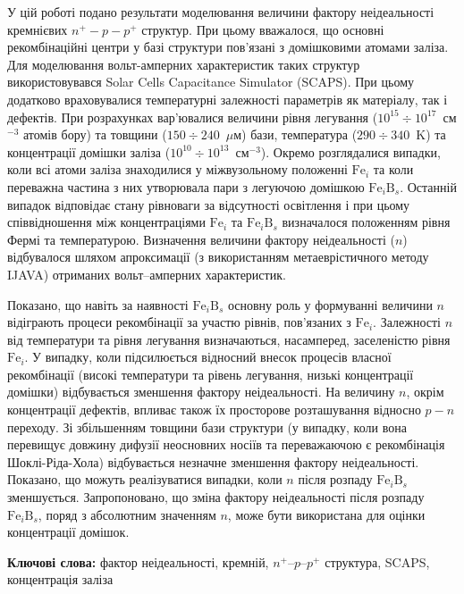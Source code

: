 \documentclass[12pt]{article}
\begin{document}
У цій роботі подано результати моделювання величини фактору не\-ідеально\-сті кремнієвих $n^+-p-p^+$ структур.
При цьому вважалося, що основні реком\-бі\-на\-цій\-ні центри у базі структури пов'язані з домішковими атомами заліза.
Для моде\-лю\-вання вольт-амперних характеристик таких структур використовувався Solar Cells Capacitance Simulator (SCAPS).
При цьому додатково враховувалися температурні залежності параметрів як матеріалу, так і дефектів.
При роз\-ра\-хун\-ках вар'ювалися величини рівня легування ($10^{15}\div10^{17}$~см$^{-3}$ атомів бору) та товщини ($150\div240$~$\mu$м) бази,
температура ($290\div340$~K) та концентрації домішки заліза ($10^{10}\div10^{13}$~см$^{-3}$).
Окремо розглядалися випадки, коли всі атоми заліза знаходилися у міжвузольному положенні $\mathrm{Fe}_i$ та
коли переважна частина з них утворювала пари з легуючою домішкою $\mathrm{Fe}_i\mathrm{B}_s$.
Останній випадок відповідає стану рівноваги за відсутності освітлення і при цьому
співвідношення між концентраціями  $\mathrm{Fe}_i$ та $\mathrm{Fe}_i\mathrm{B}_s$ визначалося положенням
рівня Фермі та тем\-пе\-ра\-ту\-рою.
Визначення величини фактору неідеальності ($n$) відбувалося шляхом апроксимації (з використанням
метаеврістичного методу IJAVA) отриманих во\-льт--ам\-пер\-них характеристик.

Показано, що навіть за наявності $\mathrm{Fe}_i\mathrm{B}_s$ основну роль у формуванні величини $n$
відіграють процеси рекомбінації за участю рівнів, пов'язаних з $\mathrm{Fe}_i$.
Залежності $n$ від температури та рівня легування визначаються, насамперед,
заселеністю рівня $\mathrm{Fe}_i$.
У випадку, коли підсилюється відносний внесок процесів власної рекомбінації (високі
температури та рівень легування, низькі концентрації до\-міш\-ки) відбувається зменшення фактору неідеальності.
На величину $n$, окрім концентрації дефектів, впливає також їх просторове розташування відносно $p-n$ переходу.
Зі збільшенням товщини бази структури (у випадку, коли вона перевищує довжину дифузії неосновних носіїв та
переважаючою є рекомбінація Шоклі-Ріда-Хола) відбувається незначне зменшення фактору неідеальності.
По\-ка\-за\-но, що можуть реалізуватися випадки, коли $n$ після розпаду $\mathrm{Fe}_i\mathrm{B}_s$ змен\-шуєть\-ся.
Запропоновано, що зміна фактору неідеальності після розпаду $\mathrm{Fe}_i\mathrm{B}_s$, поряд з абсолютним значенням $n$,  може бути використана
для оцінки концентрації домішок.


\textbf{Ключові слова:}
фактор неідеальності, кремній, $n^+$--$p$--$p^+$ структура, SCAPS, концентрація заліза
\end{document}
